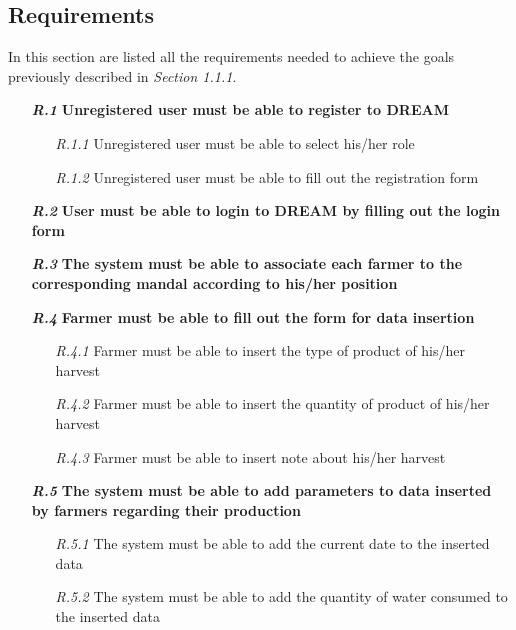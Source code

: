 \subsection{Requirements}

In this section are listed all the requirements needed to achieve the goals previously described in \textit{Section 1.1.1}.\\

\begin{itemize}

\item [\textbf{\textit{R.1}}] \textbf{Unregistered user must be able to register to DREAM}
        \begin{itemize}
            \item [\textit{R.1.1}] Unregistered user must be able to select his/her role
            \item [\textit{R.1.2}] Unregistered user must be able to fill out the registration form
        \end{itemize}
        \item [\textbf{\textit{R.2}}] \textbf{User must be able to login to DREAM by filling out the login form}

        \item [\textbf{\textit{R.3}}] \textbf{The system must be able to associate each farmer to the corresponding mandal according to his/her position}
        
            \item [\textbf{\textit{R.4}}] \textbf{Farmer must be able to fill out the form for data insertion}
            \begin{itemize}
                \item [\textit{R.4.1}] Farmer must be able to insert the type of product of his/her harvest
                \item [\textit{R.4.2}] Farmer must be able to insert the quantity of product of his/her harvest
	            \item [\textit{R.4.3}] Farmer must be able to insert note about his/her harvest
            \end{itemize}
            \item [\textbf{\textit{R.5}}] \textbf{The system must be able to add parameters to data inserted by farmers regarding their production}
            \begin{itemize}
                \item [\textit{R.5.1}] The system must be able to add the current date to the inserted data
                \item [\textit{R.5.2}] The system must be able to add the quantity of water consumed to the inserted data
            \end{itemize}


\end{itemize}
